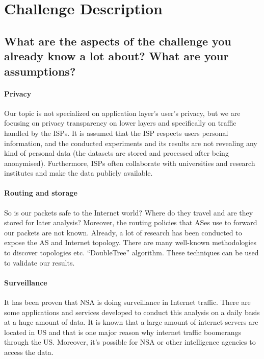 \section{Challenge Description}
\label{sec_a}

\subsection{What are the aspects of the challenge you already know a lot about?
What are your assumptions?}

\paragraph{Privacy}
Our topic is not specialized  on application layer's  user's privacy,  but we 
are focusing on privacy transparency on lower layers and specifically on traffic 
handled by the ISPs.
It is assumed that the ISP respects users personal information, and the 
conducted experiments and  its results are not revealing any kind of personal 
data (the datasets are stored  and processed after being anonymised). 
Furthermore, ISPs often collaborate with universities and research institutes 
and make the data publicly available.

\paragraph{Routing and storage}
So is our packets safe to the Internet world? Where do they travel and are they 
stored for later analysis? Moreover, the routing policies that ASes use to 
forward our packets are not known. Already, a lot of research has been conducted
to expose the AS and Internet topology. There are many well-known methodologies 
to discover topologies etc. ``DoubleTree'' algorithm. These techniques can be 
used  to validate our results.

\paragraph{Surveillance}
It has been proven that NSA is doing surveillance in Internet traffic. There are
some applications and services developed to conduct this analysis on a daily 
basis at a huge amount of data. It is known that a large amount of internet 
servers are located in US and that is one major reason why internet traffic 
boomerangs through the US. Moreover, it's possible for NSA or other intelligence
agencies to access the data.

